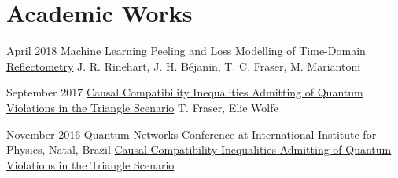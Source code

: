 \documentclass{article}
\begin{document}
    \section{Academic Works}
        {
            \begin{paperlist}
                \item{April 2018}
                {\href{https://arxiv.org/abs/1804.04756}{Machine Learning Peeling and Loss Modelling of Time-Domain Reflectometry}}
                {J. R. Rinehart, J. H. Béjanin, T. C. Fraser, M. Mariantoni}
                {}
                \item{September 2017}
                {\href{https://arxiv.org/abs/1709.06242}{Causal Compatibility Inequalities Admitting of Quantum Violations in the Triangle Scenario}}
                {T. Fraser, Elie Wolfe}
                {}
            \end{paperlist}
        }
        {
            \begin{academiclist}
                \item{November 2016}
                {Quantum Networks Conference at International Institute for Physics, Natal, Brazil}
                {\href{https://github.com/tcfraser/tcfraser.github.io/raw/master/documents/quantum_networks_brazil_2016.pdf}{Causal Compatibility Inequalities Admitting of Quantum Violations in the Triangle Scenario}}
            \end{academiclist}
        }
\end{document}
